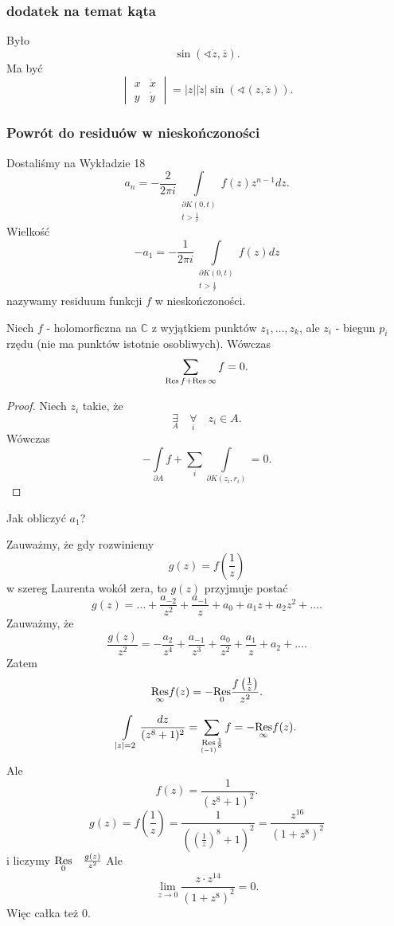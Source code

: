 \documentclass[../main.tex]{subfiles}
\begin{document}
    \subsubsection{dodatek na temat kąta}
    Było
    \[
        \sin(\sphericalangle \dot{z}, \overline{z})
    .\]
Ma być
\[
    \begin{vmatrix} x &\dot{x}\\ y & \dot{y} \end{vmatrix} = |z| |\dot{z}| \sin\left( \sphericalangle(z,\dot{z}) \right)
.\]
\subsubsection{Powrót do residuów w nieskończoności}
Dostaliśmy na Wykładzie 18
\[
    a_n = - \frac{2}{2 \pi i} \int\limits_{\substack{\partial K(0,t)\\ t > \frac{1}{r}}} f(z) z^{n-1}dz
.\]
Wielkość
\[
    - a_1 = - \frac{1}{2\pi i}\int\limits_{\substack{\partial K(0,t)\\ t > \frac{1}{r}}}f(z) dz
\]
nazywamy residuum funkcji $f$ w nieskończoności.
\begin{stw}
    Niech $f$ - holomorficzna na $\mathbb{C}$ z wyjątkiem punktów $z_1,\ldots,z_k$, ale $z_i$ - biegun $p_i$ rzędu (nie ma punktów istotnie osobliwych). Wówczas
    \[
    \sum_{\operatorname{Res} f + \operatorname{Res} \infty}f = 0
    .\]
\end{stw}
\begin{proof}
    Niech $z_i$ takie, że
    \[
    \underset{A}{\exists} \quad \underset{i}{\forall}\quad z_i\in A
    .\]
Wówczas
\[
    -\int\limits_{\partial A}f + \sum_i\int\limits_{\partial K(z_i,r_i)} = 0
.\]
\end{proof}
\begin{pytanie}Jak obliczyć $a_1$?\end{pytanie}
    Zauważmy, że gdy rozwiniemy
    \[
        g(z) = f\left(\frac{1}{z}\right)
    \]
    w szereg Laurenta wokół zera, to $g(z)$ przyjmuje postać
    \[
        g(z) = \ldots + \frac{a_{-2}}{z^2} + \frac{a_{-1}}{z} + a_0 + a_1z + a_2z^2 + \ldots
    .\]
Zauważmy, że
\[
    \frac{g(z)}{z^2} = -\frac{a_{2}}{z^4} + \frac{a_{-1}}{z^3} + \frac{a_0}{z^2} + \frac{a_1}{z} + a_2 + \ldots
.\]
Zatem
\[
    \underset{\infty}{\operatorname{Res}} f(z) = - \underset{0}{\operatorname{Res}} \frac{f\left( \frac{1}{z} \right) }{z^2}
.\]
\begin{przyklad}
    \[
        \int\limits_{|z| = 2}\frac{dz}{(z^8 + 1)^2} = \sum\limits_{\underset{(-1)}{\operatorname{Res}} \frac{1}{8}} f = - \underset{\infty}{\operatorname{Res}} f(z)
    .\]
Ale
\[
    f(z) = \frac{1}{(z^8 + 1)^2}
.\]
\[
    g(z) = f\left( \frac{1}{z} \right) = \frac{1}{\left( \left( \frac{1}{z} \right) ^8 + 1 \right) ^2} = \frac{z^{16}}{(1 + z^8)^2}
\]
    i liczymy $\underset{0}{\operatorname{Res}}\quad \frac{g(z)}{z^2}$
    Ale
    \[
        \lim\limits_{z\to 0}\frac{z\cdot z^{14}}{(1+z^8)^2} = 0
    .\]
Więc całka też $0$.
\end{przyklad}
\end{document}
